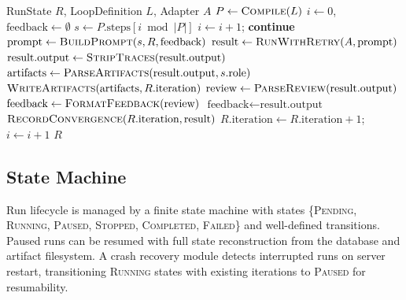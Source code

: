\documentclass[10pt]{article}
\begin{document}
\begin{algorithm}[t]
\caption{MI-Workbench Execution Loop}
\label{alg:loop}
\begin{algorithmic}[1]
\REQUIRE RunState $R$, LoopDefinition $L$, Adapter $A$
\STATE $P \leftarrow \textsc{Compile}(L)$ 
\STATE $i \leftarrow 0$, $\text{feedback} \leftarrow \emptyset$
  \STATE $s \leftarrow P.\text{steps}[i \bmod |P|]$
    \STATE $i \leftarrow i + 1$; \textbf{continue}
  \ENDIF
  \STATE $\text{prompt} \leftarrow \textsc{BuildPrompt}(s, R, \text{feedback})$
  \STATE $\text{result} \leftarrow \textsc{RunWithRetry}(A, \text{prompt})$
  \STATE $\text{result.output} \leftarrow \textsc{StripTraces}(\text{result.output})$
  \STATE $\text{artifacts} \leftarrow \textsc{ParseArtifacts}(\text{result.output}, s.\text{role})$
  \STATE $\textsc{WriteArtifacts}(\text{artifacts}, R.\text{iteration})$
    \STATE $\text{review} \leftarrow \textsc{ParseReview}(\text{result.output})$
    \STATE $\text{feedback} \leftarrow \textsc{FormatFeedback}(\text{review})$
  \ELSE
    \STATE $\text{feedback} \leftarrow \text{result.output}$
  \ENDIF
  \STATE $\textsc{RecordConvergence}(R.\text{iteration}, \text{result})$
  \STATE $R.\text{iteration} \leftarrow R.\text{iteration} + 1$; $i \leftarrow i + 1$
\ENDWHILE
\RETURN $R$
\end{algorithmic}
\end{algorithm}

\subsection{State Machine}
Run lifecycle is managed by a finite state machine with states \{\textsc{Pending}, \textsc{Running}, \textsc{Paused}, \textsc{Stopped}, \textsc{Completed}, \textsc{Failed}\} and well-defined transitions. Paused runs can be resumed with full state reconstruction from the database and artifact filesystem. A crash recovery module detects interrupted runs on server restart, transitioning \textsc{Running} states with existing iterations to \textsc{Paused} for resumability.
\end{document}
